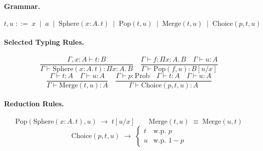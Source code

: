 \documentclass[12pt, a4paper]{article}
\theoremstyle{definition}
\theoremstyle{remark}
\newcommand{\Pop}{\mathrm{Pop}}
\newcommand{\Sphere}{\mathrm{Sphere}}
\newcommand{\Choice}{\mathrm{Choice}}
\newcommand{\Merge}{\mathrm{Merge}}
\begin{document}
\paragraph{Grammar.}
\[
  t, u \;::=\; x \;\mid\; a \;\mid\; \Sphere(x\!:\!A.\,t) \;\mid\; \Pop(t, u)
  \;\mid\; \Merge(t, u) \;\mid\; \Choice(p, t, u)
\]

\paragraph{Selected Typing Rules.}
\[
  \frac{\Gamma, x\!:\!A \vdash t : B}{\Gamma \vdash \Sphere(x\!:\!A.\,t) : \Pi x\!:\!A.\,B}
  \quad
  \frac{\Gamma \vdash f : \Pi x\!:\!A.\,B \quad \Gamma \vdash u : A}
       {\Gamma \vdash \Pop(f, u) : B[u/x]}
\]
\[
  \frac{\Gamma \vdash t : A \quad \Gamma \vdash u : A}
       {\Gamma \vdash \Merge(t, u) : A}
  \quad
  \frac{\Gamma \vdash p : \mathrm{Prob} \quad \Gamma \vdash t : A \quad \Gamma \vdash u : A}
       {\Gamma \vdash \Choice(p, t, u) : A}
\]

\paragraph{Reduction Rules.}
\[
  \Pop(\Sphere(x\!:\!A.\,t), u) \;\to\; t[u/x]
  \qquad
  \Merge(t,u) \;\equiv\; \Merge(u,t)
\]
\[
  \Choice(p, t, u) \;\to\;
  \begin{cases} t & \text{w.p.\ } p \\ u & \text{w.p.\ } 1-p \end{cases}
\]
\end{document}
